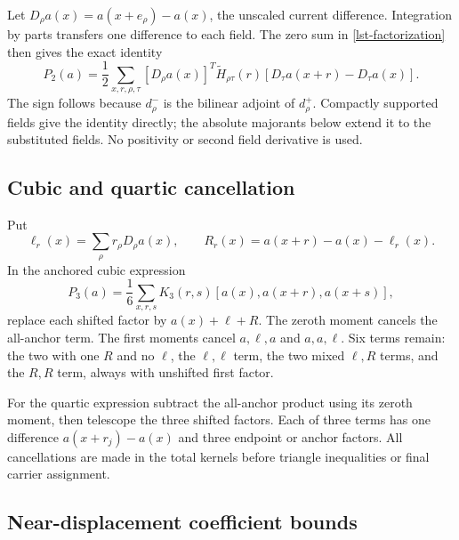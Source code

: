 Let \(D_\rho a(x)=a(x+e_\rho)-a(x)\), the unscaled current
difference. Integration by parts transfers one difference
to each field. The zero sum in \eqref{lst-factorization}
then gives the exact identity
\begin{equation}
 P_2(a)=\frac12\sum_{x,r,\rho,\tau}
 [D_\rho a(x)]^T\widetilde H_{\rho\tau}(r)
            [D_\tau a(x+r)-D_\tau a(x)].
 \label{lst-quadratic-identity}
\end{equation}
The sign follows because \(d_\rho^-\) is the bilinear
adjoint of \(d_\rho^+\). Compactly supported fields give
the identity directly; the absolute majorants below
extend it to the substituted fields. No positivity or
second field derivative is used.

\subsection{Cubic and quartic cancellation}
\label{lst-higher-algebra}

Put
\begin{equation}
 \ell_r(x)=\sum_\rho r_\rho D_\rho a(x),\qquad
 R_r(x)=a(x+r)-a(x)-\ell_r(x).
 \label{lst-Taylor}
\end{equation}
In the anchored cubic expression
\[
 P_3(a)=\frac16\sum_{x,r,s}
                K_3(r,s)[a(x),a(x+r),a(x+s)],
\]
replace each shifted factor by \(a(x)+\ell+R\).
The zeroth moment cancels the all-anchor term. The
first moments cancel \(a,\ell,a\) and \(a,a,\ell\).
Six terms remain: the two with one \(R\) and no \(\ell\),
the \(\ell,\ell\) term, the two mixed \(\ell,R\) terms,
and the \(R,R\) term, always with unshifted first factor.

For the quartic expression subtract the all-anchor product
using its zeroth moment, then telescope the three shifted
factors. Each of three terms has one difference
\(a(x+r_j)-a(x)\) and three endpoint or anchor factors.
All cancellations are made in the total kernels before
triangle inequalities or final carrier assignment.

\subsection{Near-displacement coefficient bounds}
\label{lst-near-section}

